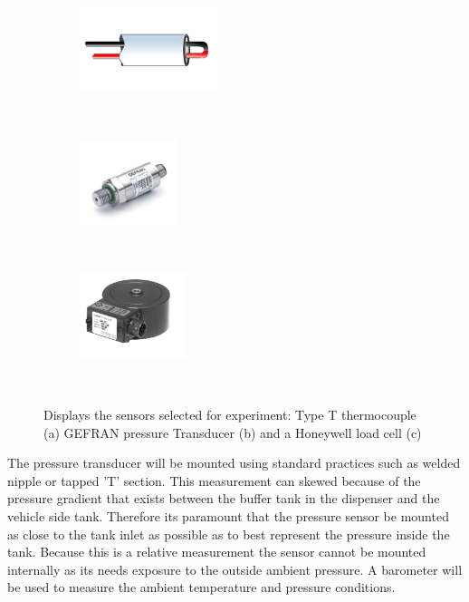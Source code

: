 \documentclass[paper=a4, fontsize=11pt, abstract=on]{scrartcl}
\numberwithin{equation}{section}		%
\numberwithin{figure}{section}			%
\numberwithin{table}{section}				%
\begin{document}
\begin{figure}[H]
        
        \begin{subfigure}[H]{0.30\textwidth}
        \centering
                \includegraphics[height = 2.5cm]{Therm}
                \caption{}				
        \end{subfigure}%
       ~~~~~
        \begin{subfigure}[h]{0.30\textwidth}
        \centering
                \includegraphics[height = 2.5cm]{press}
                \caption{}
                
        \end{subfigure}
        ~~~~~
        \begin{subfigure}[h]{0.30\textwidth}
        \centering
                \includegraphics[height = 2.5cm]{load}
                \caption{}
                
        \end{subfigure}
        ~~~~~
        \caption{Displays the sensors selected for experiment: Type T thermocouple (a) GEFRAN pressure Transducer (b) and a Honeywell load cell (c)}
        \label{results}
\end{figure}
The pressure transducer will be mounted using standard practices such as welded nipple or tapped 'T' section. This measurement can skewed because of the pressure gradient that exists between the buffer tank in the dispenser and the vehicle side tank. Therefore its paramount that the pressure sensor be mounted as close to the tank inlet as possible as to best represent the pressure inside the tank. Because this is a relative measurement the sensor cannot be mounted internally as its needs exposure to the outside ambient pressure. A barometer will be used to measure the ambient temperature and pressure conditions.
\end{document}
